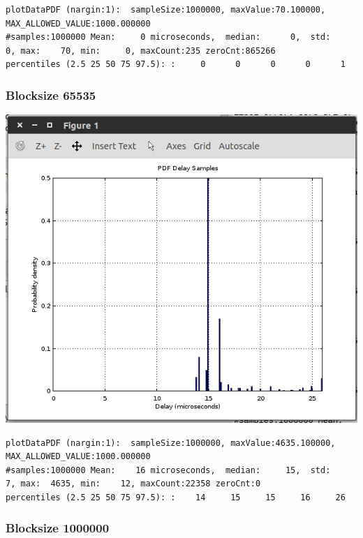 \documentclass{article}
\begin{document}
\begin{lstlisting}
plotDataPDF (nargin:1):  sampleSize:1000000, maxValue:70.100000,  MAX_ALLOWED_VALUE:1000.000000
#samples:1000000 Mean:     0 microseconds,  median:      0,  std:      0, max:    70, min:     0, maxCount:235 zeroCnt:865266
percentiles (2.5 25 50 75 97.5): :     0      0      0      0      1
\end{lstlisting}

\subsubsection{Blocksize 65535}

\includegraphics{q2/hw1-65535}

\begin{lstlisting}
plotDataPDF (nargin:1):  sampleSize:1000000, maxValue:4635.100000,  MAX_ALLOWED_VALUE:1000.000000
#samples:1000000 Mean:    16 microseconds,  median:     15,  std:      7, max:  4635, min:    12, maxCount:22358 zeroCnt:0
percentiles (2.5 25 50 75 97.5): :    14     15     15     16     26
\end{lstlisting}

\subsubsection{Blocksize 1000000}
\end{document}

